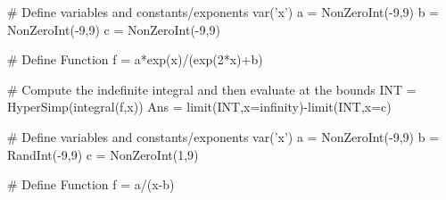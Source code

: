 
\begin{sagesilent}
# Define variables and constants/exponents
var('x')
a = NonZeroInt(-9,9)
b = NonZeroInt(-9,9)
c = NonZeroInt(-9,9)

# Define Function
f = a*exp(x)/(exp(2*x)+b)

# Compute the indefinite integral and then evaluate at the bounds
INT = HyperSimp(integral(f,x))
Ans = limit(INT,x=infinity)-limit(INT,x=c)
\end{sagesilent}




\begin{sagesilent}
# Define variables and constants/exponents
var('x')
a = NonZeroInt(-9,9)
b = RandInt(-9,9)
c = NonZeroInt(1,9)

# Define Function
f = a/(x-b)
\end{sagesilent}


